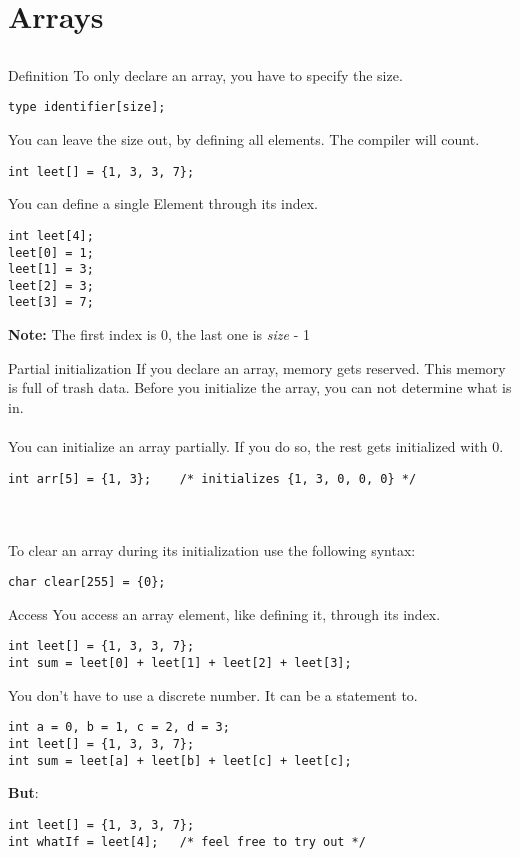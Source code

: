 \section{Arrays}
\subsection{}
\begin{frame}[fragile]{Definition}
	To only declare an array, you have to specify the size.
	\begin{lstlisting}[numbers=none, basicstyle=\itshape\small]
type identifier[size];
\end{lstlisting}
	You can leave the size out, by defining all elements. The compiler will count.
	\begin{lstlisting}[numbers=none]
int leet[] = {1, 3, 3, 7};
\end{lstlisting}
	You can define a single Element through its index.
	\begin{lstlisting}[numbers=none]
int leet[4];
leet[0] = 1;
leet[1] = 3;
leet[2] = 3;
leet[3] = 7;
\end{lstlisting}
	\textbf{Note:} The first index is 0, the last one is \textit{size} - 1
\end{frame}
\begin{frame}[fragile]{Partial initialization}
	If you declare an array, memory gets reserved. This memory is full of trash data. Before you initialize the array, you can not determine what is in.\\
	\ \\
	You can initialize an array partially. If you do so, the rest gets initialized with 0.
	\begin{lstlisting}[numbers=none]
int arr[5] = {1, 3};	/* initializes {1, 3, 0, 0, 0} */
\end{lstlisting}\ \\\ \\
	To clear an array during its initialization use the following syntax:
	\begin{lstlisting}[numbers=none]
char clear[255] = {0};
\end{lstlisting}
\end{frame}
\begin{frame}[fragile]{Access}
	You access an array element, like defining it, through its index.
	\begin{lstlisting}[numbers=none]
int leet[] = {1, 3, 3, 7};
int sum = leet[0] + leet[1] + leet[2] + leet[3];
\end{lstlisting}
	You don't have to use a discrete number. It can be a statement to.
	\begin{lstlisting}[numbers=none]
int a = 0, b = 1, c = 2, d = 3;
int leet[] = {1, 3, 3, 7};
int sum = leet[a] + leet[b] + leet[c] + leet[c];
\end{lstlisting}
	\textbf{But}:
	\begin{lstlisting}[numbers=none]
int leet[] = {1, 3, 3, 7};
int whatIf = leet[4];	/* feel free to try out */
\end{lstlisting}
\end{frame}
